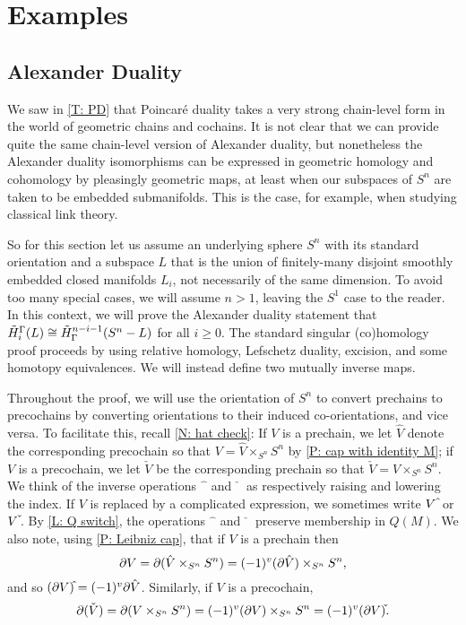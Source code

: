 
\section{Examples}\label{S: examples}

\subsection{Alexander Duality}


We saw in \cref{T: PD} that Poincar\'e duality takes a very strong chain-level form in the world of geometric chains and cochains.
It is not clear that we can provide quite the same chain-level version of Alexander duality, but nonetheless the Alexander duality isomorphisms can be expressed in geometric homology and cohomology by pleasingly geometric maps, at least when our subspaces of $S^n$ are taken to be embedded submanifolds.
This is the case, for example, when studying classical link theory.

So for this section let us assume an underlying sphere $S^n$ with its standard orientation and a subspace $L$ that is the union of finitely-many disjoint smoothly embedded closed manifolds $L_i$, not necessarily of the same dimension.
To avoid too many special cases, we will assume $n>1$, leaving the $S^1$ case to the reader.
In this context, we will prove the Alexander duality statement that $\tilde H_i^\Gamma(L) \cong \tilde H^{n-i-1}_\Gamma(S^n-L)$ for all $i \geq 0$.
The standard singular (co)homology proof proceeds by using relative homology, Lefschetz duality, excision, and some homotopy equivalences. We will instead define two mutually inverse maps.




Throughout the proof, we will use the orientation of $S^n$ to convert prechains to precochains by converting orientations to their induced co-orientations, and vice versa.
To facilitate this, recall \cref{N: hat check}:
If $V$ is a prechain, we let $\hat V$ denote the corresponding precochain so that $V = \hat V \times_{S^n} S^n$ by \cref{P: cap with identity M}; if $V$ is a precochain, we let $\check V$ be the corresponding prechain so that $\check V = V \times_{S^n} S^n$.
We think of the inverse operations $\hat{\phantom{a}}$ and $\check{\phantom{a}}$ as respectively raising and lowering the index.
If $V$ is replaced by a complicated expression, we sometimes write $V\,\hat{\vrule height1.3ex width0pt}$ or $V\,\check{\vrule height1.3ex width0pt}$.
By \cref{L: Q switch}, the operations $\hat{\phantom{a}}$ and $\check{\phantom{a}}$ preserve membership in $Q(M)$.
We also note, using \cref{P: Leibniz cap}, that if $V$ is a prechain then
$$\partial V = \partial(\hat V \times_{S^n} S^n) = (-1)^{v} (\partial \hat V) \times_{S^n} S^n,$$
and so $(\bd V)\hat{\vrule height1.3ex width0pt} = (-1)^{v} \bd \hat V$.
Similarly, if $V$ is a precochain, $$\bd(\check V) = \bd(V \times_{S^n} S^n) = (-1)^{v} (\bd V) \times_{S^n} S^n = (-1)^v (\bd V)\check{\vrule height1.3ex width0pt}.$$


